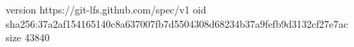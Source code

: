 version https://git-lfs.github.com/spec/v1
oid sha256:37a2af154165140c8a637007fb7d5504308d68234b37a9fefb9d3132cf27e7ac
size 43840
